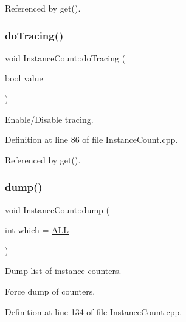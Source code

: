Referenced by get().

\hypertarget{struct_d_d4hep_1_1_instance_count_a12dd0a7dd1f4a64ef784dec2eda4b96a}{}\label{struct_d_d4hep_1_1_instance_count_a12dd0a7dd1f4a64ef784dec2eda4b96a} 
\subsubsection{\texorpdfstring{do\+Tracing()}{doTracing()}}
{\footnotesize\ttfamily void Instance\+Count\+::do\+Tracing (\begin{DoxyParamCaption}\item[{bool}]{value }\end{DoxyParamCaption})\hspace{0.3cm}{\ttfamily [static]}}



Enable/\+Disable tracing. 



Definition at line 86 of file Instance\+Count.\+cpp.



Referenced by get().

\hypertarget{struct_d_d4hep_1_1_instance_count_ae9cc6db5c9117d6451a3d817c55af8c1}{}\label{struct_d_d4hep_1_1_instance_count_ae9cc6db5c9117d6451a3d817c55af8c1} 
\subsubsection{\texorpdfstring{dump()}{dump()}}
{\footnotesize\ttfamily void Instance\+Count\+::dump (\begin{DoxyParamCaption}\item[{int}]{which = {\ttfamily \hyperlink{struct_d_d4hep_1_1_instance_count_ae1ac289e30ac5ae83640ae2ed97f947ca948324c1e49c9a310b45c9f681b381a8}{A\+LL}} }\end{DoxyParamCaption})\hspace{0.3cm}{\ttfamily [static]}}



Dump list of instance counters. 

Force dump of counters. 

Definition at line 134 of file Instance\+Count.\+cpp.



